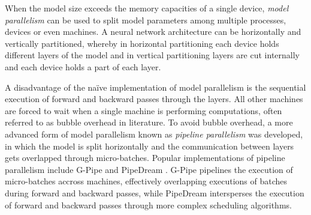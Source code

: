 When the model size exceeds the memory capacities of a single device, \textit{model parallelism} 
\cite*{10.48550/ARXIV.1811.02084, 10.48550/ARXIV.1909.08053} can be used to split model 
parameters among multiple processes, devices or even machines. A neural network architecture can be horizontally and vertically partitioned, 
whereby in horizontal partitioning each device holds different layers of the model and in vertical partitioning layers 
are cut internally and each device holds a part of each layer.

A disadvantage of the na\"ive implementation of model parallelism is the sequential execution of forward and backward passes 
through the layers. All other machines are forced to wait when a single machine is performing computations, often referred to 
as bubble overhead in literature. To avoid bubble overhead, a more advanced form of model parallelism known as \textit{pipeline parallelism}
was developed, in which the model is split horizontally and the communication between layers gets overlapped through micro-batches. 
Popular implementations of pipeline parallelism include G-Pipe \cite*{10.48550/ARXIV.1811.06965} and 
PipeDream \cite*{10.48550/ARXIV.1806.03377}. G-Pipe pipelines the execution of micro-batches accross machines, 
effectively overlapping executions of batches during forward and backward passes, while PipeDream intersperses the execution of 
forward and backward passes through more complex scheduling algorithms. 

